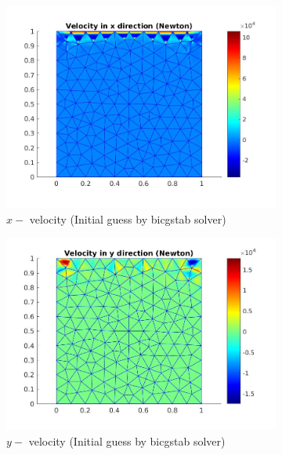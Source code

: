 \documentclass[a4paper]{book}
\begin{document}
\begin{figure}
\begin{subfigure}{0.5\textwidth}	
  \includegraphics[width=\linewidth]{lid_newton_vx_bicgstab.jpg}
  \caption{$x-$ velocity (Initial guess by bicgstab solver)}
  \label{x_vel_navier_stoke_bicgstab_lid}
\end{subfigure}
\begin{subfigure}{0.5\textwidth}	
  \includegraphics[width=\linewidth]{lid_newton_vy_bicgstab.jpg}
  \caption{$y-$ velocity (Initial guess by bicgstab solver)}
  \label{y_vel_navier_stoke_bicgstab_lid}
\end{subfigure}
\begin{subfigure}{\textwidth}	

\end{subfigure}
\end{figure}
\end{document}
